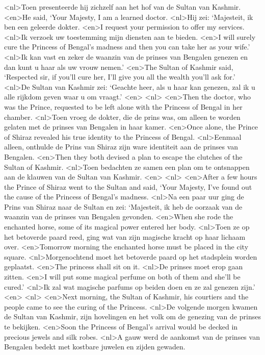 <nl>Toen presenteerde hij zichzelf aan het hof van de Sultan van Kashmir.
<en>He said, `Your Majesty, I am a learned doctor.
<nl>Hij zei: `Majesteit, ik ben een geleerde dokter.
<en>I request your permission to offer my services.
<nl>Ik verzoek uw toestemming mijn diensten aan te bieden.
<en>I will surely cure the Princess of Bengal's madness and then you can take her as your wife.'
<nl>Ik kan vast en zeker de waanzin van de prinses van Bengalen genezen en dan kunt u haar als uw vrouw nemen.'
<en>The Sultan of Kashmir said, `Respected sir, if you'll cure her, I'll give you all the wealth you'll ask for.'
<nl>De Sultan van Kashmir zei: `Geachte heer, als u haar kan genezen, zal ik u alle rijkdom geven waar u om vraagt.'
<en>
<nl>
<en>Then the doctor, who was the Prince, requested to be left alone with the Princess of Bengal in her chamber.
<nl>Toen vroeg de dokter, die de prins was, om alleen te worden gelaten met de prinses van Bengalen in haar kamer.
<en>Once alone, the Prince of Shiraz revealed his true identity to the Princess of Bengal.
<nl>Eenmaal alleen, onthulde de Prins van Shiraz zijn ware identiteit aan de prinses van Bengalen.
<en>Then they both devised a plan to escape the clutches of the Sultan of Kashmir.
<nl>Toen bedachten ze samen een plan om te ontsnappen aan de klauwen van de Sultan van Kashmir.
<en>
<nl>
<en>After a few hours the Prince of Shiraz went to the Sultan and said, `Your Majesty, I've found out the cause of the Princess of Bengal's madness.
<nl>Na een paar uur ging de Prins van Shiraz naar de Sultan en zei: `Majesteit, ik heb de oorzaak van de waanzin van de prinses van Bengalen gevonden.
<en>When she rode the enchanted horse, some of its magical power entered her body.
<nl>Toen ze op het betoverde paard reed, ging wat van zijn magische kracht  op haar lichaam over.
<en>Tomorrow morning the enchanted horse must be placed in the city square.
<nl>Morgenochtend moet het betoverde paard op het stadsplein worden geplaatst.
<en>The princess shall sit on it.
<nl>De prinses moet erop gaan zitten.
<en>I will put some magical perfume on both of them and she'll be cured.'
<nl>Ik zal wat magische parfums op beiden doen en ze zal genezen zijn.'
<en>
<nl>
<en>Next morning, the Sultan of Kashmir, his courtiers and the people came to see the curing of the Princess.
<nl>De volgende morgen kwamen de Sultan van Kashmir, zijn hovelingen en het volk om de genezing van de prinses te bekijken.
<en>Soon the Princess of Bengal's arrival would be decked in precious jewels and silk robes.
<nl>A gauw werd de aankomst van de prinses van Bengalen  bedekt met kostbare juwelen en zijden gewaden.
